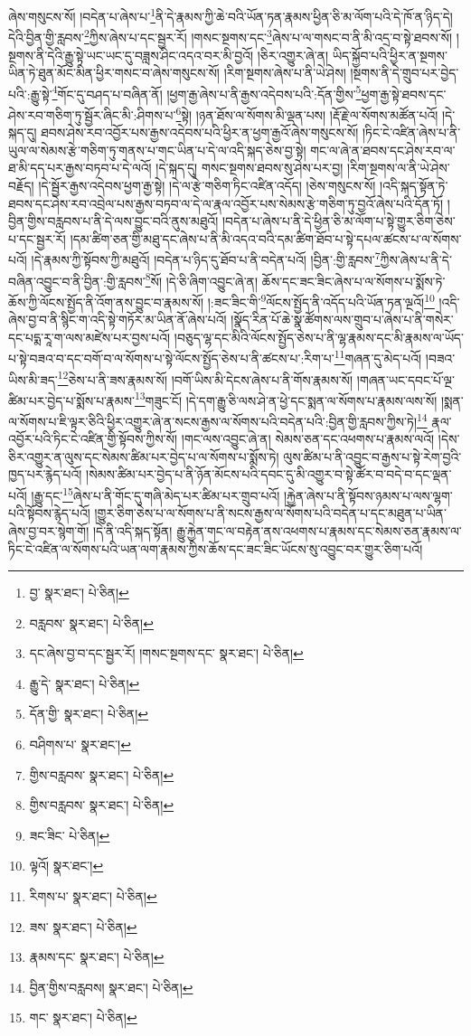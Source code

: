 ཞེས་གསུངས་སོ། །བདེན་པ་ཞེས་པ་\footnote{བྱ་  སྣར་ཐང་།  པེ་ཅིན། }ནི་དེ་རྣམས་ཀྱི་ཆེ་བའི་ཡོན་ཏན་རྣམས་ཕྱིན་ཅི་མ་ལོག་པའི་དེ་ཁོ་ན་ཉིད་དེ། དེའི་བྱིན་གྱི་རླབས་\footnote{བརླབས་  སྣར་ཐང་།  པེ་ཅིན། }ཀྱིས་ཞེས་པ་དང་སྦྱར་རོ། །གསང་སྔགས་དང་\footnote{དང་ཞེས་བྱ་བ་དང་སྦྱར་རོ། །གསང་སྔགས་དང་  སྣར་ཐང་།  པེ་ཅིན། }ཞེས་པ་ལ་གསང་བ་ནི་མི་འདྲ་བ་སྟེ་ཐབས་སོ། །སྔགས་ནི་དེའི་རྒྱུ་སྟེ་ཡང་ཡང་དུ་བཟླས་ཤིང་འདའ་བར་མི་བྱའོ། །ཅིར་འགྱུར་ཞེ་ན། ཡིད་སྐྱོབ་པའི་ཕྱིར་ན་སྔགས་ཡིན་ཏེ་ཐུན་མོང་མིན་ཕྱིར་གསང་བ་ཞེས་གསུངས་སོ། །རིག་སྔགས་ཞེས་པ་ནི་ཡེ་ཤེས། །སྔགས་ནི་དེ་གྲུབ་པར་བྱེད་པའི་:རྒྱུ་སྟེ་\footnote{རྒྱུ་དེ་  སྣར་ཐང་།  པེ་ཅིན། }གོང་དུ་བཤད་པ་བཞིན་ནོ། །ཕྱག་རྒྱ་ཞེས་པ་ནི་རྒྱས་འདེབས་པའི་:དོན་གྱིས་\footnote{དོན་གྱི་  སྣར་ཐང་།  པེ་ཅིན། }ཕྱག་རྒྱ་སྟེ་ཐབས་དང་ཤེས་རབ་གཅིག་ཏུ་སྦྱོར་ཞིང་མི་:ཤིགས་པ་\footnote{བཤིགས་པ་  སྣར་ཐང་། }སྟེ། །ཉན་ཐོས་ལ་སོགས་མི་ལྡན་པས། །རྡོ་རྗེ་ལ་སོགས་མཚོན་པའོ། །དེ་སྐད་དུ། ཐབས་ཤེས་རབ་འབྱོར་པས་རྒྱས་འདེབས་པའི་ཕྱིར་ན་ཕྱག་རྒྱའོ་ཞེས་གསུངས་སོ། །ཏིང་ངེ་འཛིན་ཞེས་པ་ནི་ཡུལ་ལ་སེམས་རྩེ་གཅིག་ཏུ་གནས་པ་གང་ཡིན་པ་དེ་ལ་འདི་སྐད་ཅེས་བྱ་སྟེ། གང་ལ་ཞེ་ན་ཐབས་དང་ཤེས་རབ་ལ་ཐ་མི་དད་པར་རྒྱས་བཏབ་པ་དེ་ལའོ། །དེ་སྐད་དུ། གསང་སྔགས་ཐབས་སུ་ཤེས་པར་བྱ། །རིག་སྔགས་ལ་ནི་ཡེ་ཤེས་བརྗོད། །དེ་སྦྱོར་རྒྱས་འདེབས་ཕྱག་རྒྱ་སྟེ། །དེ་ལ་རྩེ་གཅིག་ཏིང་འཛིན་འདོད། །ཅེས་གསུངས་སོ། །འདི་སྐད་སྟོན་ཏེ་ཐབས་དང་ཤེས་རབ་འབྲེལ་པས་རྒྱས་བཏབ་ལ་དེ་ལ་རྣལ་འབྱོར་པས་སེམས་རྩེ་གཅིག་ཏུ་བྱའོ་ཞེས་པའི་དོན་ཏོ། །བྱིན་གྱིས་བརླབས་པ་ནི་དེ་ལས་བྱུང་བའི་ནུས་མཐུའོ། །བདེན་པ་ཞེས་པ་ནི་དེ་ཕྱིན་ཅི་མ་ལོག་པ་སྟེ་གྱུར་ཅིག་ཅེས་པ་དང་སྦྱར་རོ། །དམ་ཚིག་ཅན་གྱི་མཐུ་དང་ཞེས་པ་ནི་མི་འདའ་བའི་དམ་ཚིག་ཐོབ་པ་སྟེ་དཔལ་ཚངས་པ་ལ་སོགས་པའོ། །དེ་རྣམས་ཀྱི་སྟོབས་ཀྱི་མཐུའོ། །བདེན་པ་ཉིད་དུ་ཐོབ་པ་ནི་བདེན་པའོ། །བྱིན་:གྱི་རླབས་\footnote{གྱིས་བརླབས་  སྣར་ཐང་།  པེ་ཅིན། }ཀྱིས་ཞེས་པ་ནི་དེ་བཞིན་འབྱུང་བ་ནི་བྱིན་:གྱི་རླབས་\footnote{གྱིས་བརླབས་  སྣར་ཐང་།  པེ་ཅིན། }སོ། །དེ་ཅི་ཞིག་འབྱུང་ཞེ་ན། ཆོས་དང་ཟང་ཟིང་ཞེས་པ་ལ་སོགས་པ་སྨོས་ཏེ་ཆོས་ཀྱི་ལོངས་སྤྱོད་ནི་འོག་ནས་བྱུང་བ་རྣམས་སོ། །:ཟང་ཟིང་གི་\footnote{ཟང་ཟིང་  པེ་ཅིན། }ལོངས་སྤྱོད་ནི་འདོད་པའི་ཡོན་ཏན་ལྔའོ།\footnote{ལྟའོ།  སྣར་ཐང་། } །འདི་ཞེས་བྱ་བ་ནི་སྙིང་ག་འདི་སྟེ་གཏོར་མ་ཡིན་ནོ་ཞེས་པའོ། །སྣོད་རིན་པོ་ཆེ་སྣ་ཚོགས་ལས་གྲུབ་པ་ཞེས་པ་ནི་གསེར་དང་པདྨ་རཱ་ག་ལས་མཛེས་པར་བྱས་པའོ། །བཅུད་ལྷ་དང་མིའི་ལོངས་སྤྱོད་ཅེས་པ་ནི་ལྷ་རྣམས་དང་མི་རྣམས་ལ་ཡོད་པ་སྟེ་བཟའ་བ་དང་བགོ་བ་ལ་སོགས་པ་སྟེ་ལོངས་སྤྱོད་ཅེས་པ་ནི་ཚངས་པ་:རིག་པ་\footnote{རིགས་པ་  སྣར་ཐང་།  པེ་ཅིན། }གཞན་དུ་མེད་པའོ། །བཟའ་ཡིས་མི་ཟད་\footnote{ཟས་  སྣར་ཐང་།  པེ་ཅིན། }ཅེས་པ་ནི་ཟས་རྣམས་སོ། །བགོ་ཡིས་མི་དེངས་ཞེས་པ་ནི་གོས་རྣམས་སོ། །གཞན་ཡང་དབང་པོ་ལྔ་ཚིམ་པར་བྱེད་པ་སྨོས་པ་རྣམས་\footnote{རྣམས་དང་  སྣར་ཐང་།  པེ་ཅིན། }གཟུང་ངོ། །དེ་དག་རྒྱུ་ཅི་ལས་ཤེ་ན་ཕྱེ་དང་སྨན་ལ་སོགས་པ་རྣམས་ལས་སོ། །སྨན་ལ་སོགས་པ་ཇི་ལྟར་ཅིའི་ཕྱིར་འགྱུར་ཞེ་ན་སངས་རྒྱས་ལ་སོགས་པའི་བདེན་པའི་:བྱིན་གྱི་རླབས་ཀྱིས་ཏེ།\footnote{བྱིན་གྱིས་བརླབས།  སྣར་ཐང་།  པེ་ཅིན། } རྣལ་འབྱོར་པའི་ཏིང་ངེ་འཛིན་གྱི་སྟོབས་ཀྱིས་སོ། །གང་ལས་འབྱུང་ཞེ་ན། སེམས་ཅན་དང་འཕགས་པ་རྣམས་ལའོ། །དེས་ཅིར་འགྱུར་ན་ལུས་དང་སེམས་ཚིམ་པར་བྱེད་པ་ལ་སོགས་པ་སྨོས་ཏེ། ལུས་ཚིམ་པ་ནི་འབྱུང་བ་རྒྱས་པ་སྟེ་རེག་བྱའི་ཁྱད་པར་རྙེད་པའོ། །སེམས་ཚིམ་པར་བྱེད་པ་ནི་ཉོན་མོངས་པའི་དབང་དུ་མི་འགྱུར་བ་སྟེ་ཚོར་བ་བདེ་བ་དང་ལྡན་པའོ། །རྒྱུ་དང་\footnote{གང་  སྣར་ཐང་།  པེ་ཅིན། }ཞེས་པ་ནི་གོང་དུ་གཞི་མེད་པར་ཚིམ་པར་གྲུབ་པའོ། །རྐྱེན་ཞེས་པ་ནི་སྟོབས་ཉམས་པ་ལས་ལྷག་པའི་སྟོབས་རྙེད་པའོ། །གྱུར་ཅིག་ཅེས་པ་ལ་སོགས་པ་ནི་སངས་རྒྱས་ལ་སོགས་པའི་བདེན་པ་དང་མཐུན་པ་ཡིན་ཞེས་བྱ་བར་སྙེག་གོ། །དེ་ནི་འདི་སྐད་སྟོན། རྒྱུ་རྐྱེན་གང་ལ་བརྟེན་ནས་འཕགས་པ་རྣམས་དང་སེམས་ཅན་རྣམས་ལ་ཏིང་ངེ་འཛིན་ལ་སོགས་པའི་ཡན་ལག་རྣམས་ཀྱིས་ཆོས་དང་ཟང་ཟིང་ཡོངས་སུ་འབྱུང་བར་གྱུར་ཅིག་པའོ། 